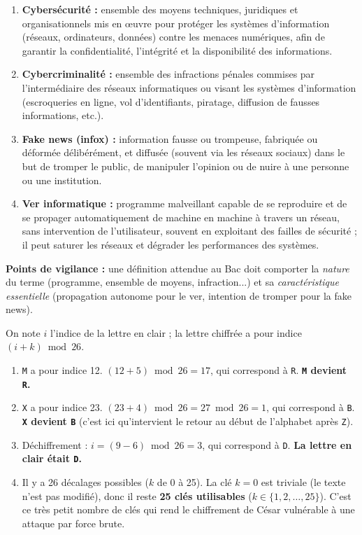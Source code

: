 \documentclass[11pt]{article}
\begin{document}
\begin{corrige}
\begin{enumerate}
\item \textbf{Cybersécurité :} ensemble des moyens techniques, juridiques et organisationnels mis en œuvre pour protéger les systèmes d'information (réseaux, ordinateurs, données) contre les menaces numériques, afin de garantir la confidentialité, l'intégrité et la disponibilité des informations.
\item \textbf{Cybercriminalité :} ensemble des infractions pénales commises par l'intermédiaire des réseaux informatiques ou visant les systèmes d'information (escroqueries en ligne, vol d'identifiants, piratage, diffusion de fausses informations, etc.).
\item \textbf{Fake news (infox) :} information fausse ou trompeuse, fabriquée ou déformée délibérément, et diffusée (souvent via les réseaux sociaux) dans le but de tromper le public, de manipuler l'opinion ou de nuire à une personne ou une institution.
\item \textbf{Ver informatique :} programme malveillant capable de se reproduire et de se propager automatiquement de machine en machine à travers un réseau, sans intervention de l'utilisateur, souvent en exploitant des failles de sécurité ; il peut saturer les réseaux et dégrader les performances des systèmes.
\end{enumerate}
\textbf{Points de vigilance :} une définition attendue au Bac doit comporter la \emph{nature} du terme (programme, ensemble de moyens, infraction...) et sa \emph{caractéristique essentielle} (propagation autonome pour le ver, intention de tromper pour la fake news).
\end{corrige}

\begin{corrige}
On note $i$ l'indice de la lettre en clair ; la lettre chiffrée a pour indice $(i + k) \bmod 26$.
\begin{enumerate}
\item \texttt{M} a pour indice 12. $(12 + 5) \bmod 26 = 17$, qui correspond à \texttt{R}. \textbf{\texttt{M} devient \texttt{R}.}
\item \texttt{X} a pour indice 23. $(23 + 4) \bmod 26 = 27 \bmod 26 = 1$, qui correspond à \texttt{B}. \textbf{\texttt{X} devient \texttt{B}} (c'est ici qu'intervient le retour au début de l'alphabet après \texttt{Z}).
\item Déchiffrement : $i = (9 - 6) \bmod 26 = 3$, qui correspond à \texttt{D}. \textbf{La lettre en clair était \texttt{D}.}
\item Il y a 26 décalages possibles ($k$ de 0 à 25). La clé $k = 0$ est triviale (le texte n'est pas modifié), donc il reste \textbf{25 clés utilisables} ($k \in \{1, 2, \dots, 25\}$). C'est ce très petit nombre de clés qui rend le chiffrement de César vulnérable à une attaque par force brute.
\end{enumerate}
\end{corrige}
\end{document}
